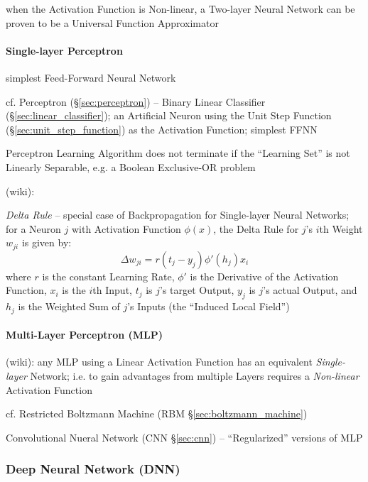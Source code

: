 when the Activation Function is Non-linear, a Two-layer Neural Network can be
proven to be a Universal Function Approximator



\paragraph{Single-layer Perceptron}\label{sec:single_layer_perceptron}\hfill

simplest Feed-Forward Neural Network

cf. Perceptron (\S\ref{sec:perceptron}) -- Binary Linear Classifier
(\S\ref{sec:linear_classifier}); an Artificial Neuron using the Unit Step
Function (\S\ref{sec:unit_step_function}) as the Activation Function; simplest
FFNN

Perceptron Learning Algorithm does not terminate if the ``Learning Set'' is not
Linearly Separable, e.g. a Boolean Exclusive-OR problem

(wiki):

\emph{Delta Rule} -- special case of Backpropagation for Single-layer Neural
Networks; for a Neuron $j$ with Activation Function $\phi(x)$, the Delta Rule
for $j$'s $i$th Weight $w_{ji}$ is given by:
\[
  \Delta w_{ji} = r(t_j - y_j) \phi'(h_j) x_i
\]
where $r$ is the constant Learning Rate, $\phi'$ is the Derivative of the
Activation Function, $x_i$ is the $i$th Input, $t_j$ is $j$'s target Output,
$y_j$ is $j$'s actual Output, and $h_j$ is the Weighted Sum of $j$'s Inputs (the
``Induced Local Field'')



\paragraph{Multi-Layer Perceptron (MLP)}\label{sec:mlp}\hfill

(wiki): any MLP using a Linear Activation Function has an equivalent
\emph{Single-layer} Network; i.e. to gain advantages from multiple Layers
requires a \emph{Non-linear} Activation Function

cf. Restricted Boltzmann Machine (RBM \S\ref{sec:boltzmann_machine})

\fist Convolutional Nueral Network (CNN \S\ref{sec:cnn}) -- ``Regularized''
versions of MLP



\subsubsection{Deep Neural Network (DNN)}\label{sec:dnn}

